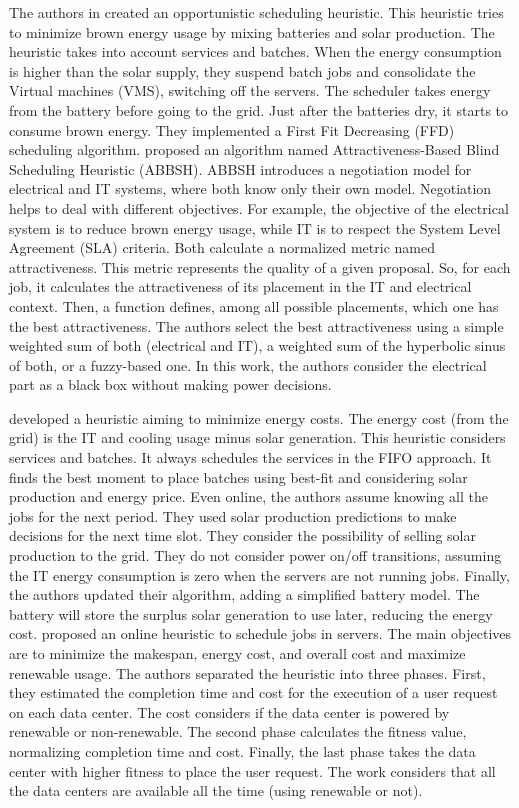 The authors in \cite{li2017balancing} created an opportunistic scheduling heuristic. This heuristic tries to minimize brown energy usage by mixing batteries and solar production. The heuristic takes into account services and batches. When the energy consumption is higher than the solar supply, they suspend batch jobs and consolidate the Virtual machines (VMS), switching off the servers. The scheduler takes energy from the battery before going to the grid. Just after the batteries dry, it starts to consume brown energy. They implemented a First Fit Decreasing (FFD) scheduling algorithm. \citeauthor{grange2018green} \cite{grange2018green} proposed an algorithm named Attractiveness-Based Blind Scheduling Heuristic (ABBSH). ABBSH introduces a negotiation model for electrical and IT systems, where both know only their own model. Negotiation helps to deal with different objectives. For example, the objective of the electrical system is to reduce brown energy usage, while IT is to respect the System Level Agreement (SLA) criteria. Both calculate a normalized metric named attractiveness. This metric represents the quality of a given proposal. So, for each job, it calculates the attractiveness of its placement in the IT and electrical context. Then, a function defines, among all possible placements, which one has the best attractiveness. The authors select the best attractiveness using a simple weighted sum of both (electrical and IT), a weighted sum of the hyperbolic sinus of both, or a fuzzy-based one. In this work, the authors consider the electrical part as a black box without making power decisions.

\citeauthor{haghshenas2020infrastructure} \cite{haghshenas2020infrastructure} developed a heuristic aiming to minimize energy costs. The energy cost (from the grid) is the IT and cooling usage minus solar generation. This heuristic considers services and batches. It always schedules the services in the FIFO approach. It finds the best moment to place batches using best-fit and considering solar production and energy price. Even online, the authors assume knowing all the jobs for the next period. They used solar production predictions to make decisions for the next time slot. They consider the possibility of selling solar production to the grid. They do not consider power on/off transitions, assuming the IT energy consumption is zero when the servers are not running jobs. Finally, the authors updated their algorithm, adding a simplified battery model. The battery will store the surplus solar generation to use later, reducing the energy cost. \cite{nayak2021efficient} proposed an online heuristic to schedule jobs in servers. The main objectives are to minimize the makespan, energy cost, and overall cost and maximize renewable usage. The authors separated the heuristic into three phases. First, they estimated the completion time and cost for the execution of a user request on each data center. The cost considers if the data center is powered by renewable or non-renewable. The second phase calculates the fitness value, normalizing completion time and cost. Finally, the last phase takes the data center with higher fitness to place the user request. The work considers that all the data centers are available all the time (using renewable or not).

